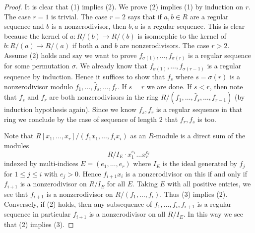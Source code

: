 \begin{proof}
	It is clear that (1) implies (2). We prove (2) implies (1) by induction
	on $r$. The case $r = 1$ is trivial. The case $r = 2$ says that if
	$a, b \in R$ are a regular sequence and $b$ is a nonzerodivisor, then
	$b, a$ is a regular sequence. This is clear because the kernel of
	$a : R/(b) \to R/(b)$ is isomorphic to the kernel of $b : R/(a) \to R/(a)$
	if both $a$ and $b$ are nonzerodivisors. The case $r > 2$. Assume
	(2) holds and say we want to prove $f_{\sigma(1)}, \ldots, f_{\sigma(r)}$
	is a regular sequence for some permutation $\sigma$. We already know
	that $f_{\sigma(1)}, \ldots, f_{\sigma(r - 1)}$ is a regular sequence
	by induction. Hence it suffices to show that $f_s$ where $s = \sigma(r)$
	is a nonzerodivisor modulo $f_1, \ldots, \hat f_s, \ldots, f_r$.
	If $s = r$ we are done. If $s < r$, then note that $f_s$ and $f_r$
	are both nonzerodivisors in the ring
	$R/(f_1, \ldots, \hat f_s, \ldots, f_{r - 1})$
	(by induction hypothesis again). Since we know $f_s, f_r$ is a
	regular sequence in that ring we conclude by the case of sequence of length
	$2$ that $f_r, f_s$ is too.
	
	\medskip\noindent
	Note that $R[x_1, \ldots, x_r]/(f_1x_1, \ldots, f_ix_i)$ as an $R$-module
	is a direct sum of the modules
	$$
	R/I_E \cdot x_1^{e_1} \ldots x_r^{e_r}
	$$
	indexed by multi-indices $E = (e_1, \ldots, e_r)$ where
	$I_E$ is the ideal generated by $f_j$ for $1 \leq j \leq i$
	with $e_j > 0$. Hence $f_{i + 1}x_i$ is a nonzerodivisor on this if
	and only if $f_{i + 1}$ is a nonzerodivisor on $R/I_E$ for all $E$.
	Taking $E$ with all positive entries, we see that $f_{i + 1}$
	is a nonzerodivisor on $R/(f_1, \ldots, f_i)$. Thus (3) implies (2).
	Conversely, if (2) holds, then any subsequence of
	$f_1, \ldots, f_i, f_{i + 1}$ is a regular sequence
	in particular $f_{i + 1}$ is a nonzerodivisor on all $R/I_E$.
	In this way we see that (2) implies (3).
\end{proof}



